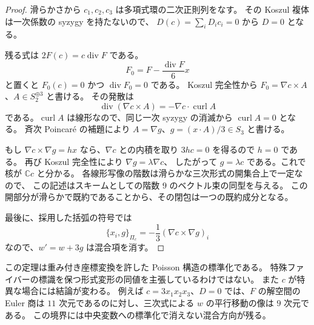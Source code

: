 \begin{proof}
滑らかさから $c_1,c_2,c_3$ は多項式環の二次正則列をなす。
その Koszul 複体は一次係数の syzygy を持たないので、
$D(c)=\sum_iD_i c_i=0$ から $D=0$ となる。

残る式は $2F(c)=c\operatorname{div}F$ である。
\[
 F_0=F-\frac{\operatorname{div}F}{6}x
\]
と置くと $F_0(c)=0$ かつ $\operatorname{div}F_0=0$ である。
Koszul 完全性から $F_0=\nabla c\times A$、$A\in S_2^{\oplus3}$ と書ける。
その発散は
\[
 \operatorname{div}(\nabla c\times A)
 =-\nabla c\cdot\operatorname{curl}A
\]
である。$\operatorname{curl}A$ は線形なので、同じ一次 syzygy の消滅から
$\operatorname{curl}A=0$ となる。
斉次 Poincar\'e の補題により
$A=\nabla g$、$g=(x\cdot A)/3\in S_3$ と書ける。

もし $\nabla c\times\nabla g=hx$ なら、$\nabla c$ との内積を取り
$3hc=0$ を得るので $h=0$ である。
再び Koszul 完全性により $\nabla g=\lambda\nabla c$、
したがって $g=\lambda c$ である。これで核が $\mathbb Cc$ と分かる。
各線形写像の階数は滑らかな三次形式の開集合上で一定なので、
この記述はスキームとしての階数 $9$ のベクトル束の同型を与える。
この開部分が滑らかで既約であることから、その閉包は一つの既約成分となる。

最後に、採用した括弧の符号では
\[
 \{x_i,g\}_{\Pi_c}
 =-\frac13(\nabla c\times\nabla g)_i
\]
なので、$w'=w+3g$ は混合項を消す。
\end{proof}

この定理は重み付き座標変換を許した Poisson 構造の標準化である。
特殊ファイバーの標識を保つ形式変形の同値を主張しているわけではない。
また $c$ が特異な場合には結論が変わる。
例えば $c=3x_1x_2x_3$、$D=0$ では、$F$ の解空間の Euler 商は
$11$ 次元であるのに対し、三次式による $w$ の平行移動の像は $9$ 次元である。
この境界には中央変数への標準化で消えない混合方向が残る。

